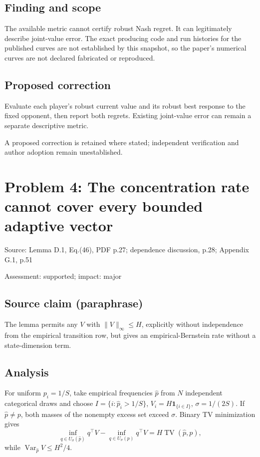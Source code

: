 \documentclass[11pt]{article}
\begin{document}
\subsection*{Finding and scope}

The available metric cannot certify robust Nash regret. It can legitimately describe joint-value error. The exact producing code and run histories for the published curves are not established by this snapshot, so the paper’s numerical curves are not declared fabricated or reproduced.

\subsection*{Proposed correction}

Evaluate each player’s robust current value and its robust best response to the fixed opponent, then report both regrets. Existing joint-value error can remain a separate descriptive metric.

A proposed correction is retained where stated; independent verification and author adoption remain unestablished.

\section*{Problem 4: The concentration rate cannot cover every bounded adaptive vector}

Source: Lemma D.1, Eq.(46), PDF p.27; dependence discussion, p.28; Appendix G.1, p.51

Assessment: supported; impact: major

\subsection*{Source claim (paraphrase)}

The lemma permits any \(V\) with \(\|V\|_\infty\le H\), explicitly without independence from the empirical transition row, but gives an empirical-Bernstein rate without a state-dimension term.

\subsection*{Analysis}

For uniform \(p_i=1/S\), take empirical frequencies \(\hat p\) from \(N\) independent categorical draws and choose \(I=\{i:\hat p_i>1/S\}\), \(V_i=H\mathbf1_{\{i\in I\}}\), \(\sigma=1/(2S)\). If \(\hat p\ne p\), both masses of the nonempty excess set exceed \(\sigma\). Binary TV minimization gives \[\inf_{q\in U_\sigma(\hat p)}q^\top V-\inf_{q\in U_\sigma(p)}q^\top V=H\operatorname{TV}(\hat p,p),\] while \(\operatorname{Var}_{\hat p}V\le H^2/4\).
\end{document}
